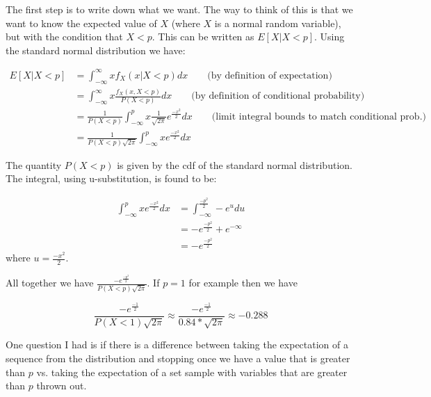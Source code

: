 \begin{enumerate}
The first step is to write down what we want. The way to think of this is that we want to know the expected value of $X$ (where $X$ is a normal random variable), but with the condition that $X<p$. This can be written as $ E[X|X<p]$. Using the standard normal distribution we have:


\begin{align*}
E[X|X<p] &= \int_{-\infty}^{\infty} x f_X(x|X<p) dx \hspace{2em}  \text{(by definition of expectation)}\\ 
&=  \int_{-\infty}^{\infty} x \frac{f_X(x, X<p)}{P(X<p)} dx  \hspace{2em} \text{(by definition of conditional probability)} \\
&= \frac{1}{P(X<p)} \int_{-\infty}^{p} x \frac{1}{\sqrt{2\pi}}e^{\frac{-x^2}{2}} dx \hspace{2em} \text{(limit integral bounds to match conditional prob.)} \\
&= \frac{1}{P(X<p)\sqrt{2\pi}} \int_{-\infty}^{p} x e^{\frac{-x^2}{2}} dx
\end{align*}

\noindent The quantity $P(X<p)$ is given by the cdf of the standard normal distribution. The integral, using u-substitution, is found to be:

\begin{equation}
\begin{split}
\int_{-\infty}^{p} x e^{\frac{-x^2}{2}} dx  &= \int_{-\infty}^{\frac{-p^2}{2}} - e^{u} du \\
&= -e^{\frac{-p^2}{2}} + e^{-\infty} \\
&= -e^{\frac{-p^2}{2}}
\end{split}
\end{equation}
\noindent where $u=\frac{-x^2}{2}$.

All together we have $\frac{-e^{\frac{-p^2}{2}}}{P(X<p)\sqrt{2\pi}}$. If $p=1$ for example then we have 

\begin{equation}
\frac{-e^{\frac{-1}{2}}}{P(X<1)\sqrt{2\pi}} \approx \frac{-e^{\frac{-1}{2}}}{0.84*\sqrt{2\pi}} \approx -0.288
\end{equation}


One question I had is if there is a difference between taking the expectation of a sequence from the distribution and stopping once we have a value that is greater than $p$ vs. taking the expectation of a set sample with variables that are greater than $p$ thrown out. 


\end{enumerate}
